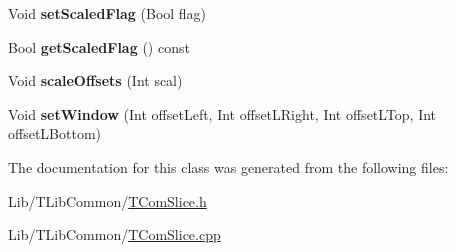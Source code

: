 \begin{DoxyCompactItemize}
Void {\bfseries set\+Scaled\+Flag} (Bool flag)
\item 
\mbox{\label{class_window_afe84501d54ff8b086be62c8beea672ab}} 
Bool {\bfseries get\+Scaled\+Flag} () const
\item 
\mbox{\label{class_window_ae9fcfaafa3cb165a1173877d4d9742ad}} 
Void {\bfseries scale\+Offsets} (Int scal)
\item 
\mbox{\label{class_window_a76977cad386a7f920fe1bc170fa3db29}} 
Void {\bfseries set\+Window} (Int offset\+Left, Int offset\+L\+Right, Int offset\+L\+Top, Int offset\+L\+Bottom)
\end{DoxyCompactItemize}


The documentation for this class was generated from the following files\+:\begin{DoxyCompactItemize}
\item 
Lib/\+T\+Lib\+Common/\hyperlink{_t_com_slice_8h}{T\+Com\+Slice.\+h}\item 
Lib/\+T\+Lib\+Common/\hyperlink{_t_com_slice_8cpp}{T\+Com\+Slice.\+cpp}\end{DoxyCompactItemize}
